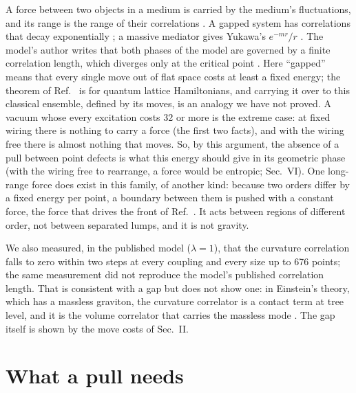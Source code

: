 \documentclass[pre,twocolumn,superscriptaddress,nofootinbib]{revtex4-2}
\begin{document}
A force between two objects in a medium is carried by the medium's fluctuations, and its range is the range of their
correlations \cite{KG99}. A gapped system has correlations that decay exponentially \cite{HK06}; a massive mediator gives
Yukawa's $e^{-mr}/r$ \cite{Tong}. The model's author writes that both phases of the model are governed by a finite
correlation length, which diverges only at the critical point \cite{T25}. Here ``gapped'' means that every single move
out of flat space costs at least a fixed energy; the theorem of Ref.~\cite{HK06} is for quantum lattice Hamiltonians,
and carrying it over to this classical ensemble, defined by its moves, is an analogy we have not proved. A vacuum whose
every excitation costs 32 or more is the extreme case: at fixed wiring there is nothing to carry a force (the first two
facts), and with the wiring free there is almost nothing that moves. So, by this argument, the absence of a pull
between point defects is what this energy should give in its geometric phase (with the wiring free to rearrange, a
force would be entropic; Sec.~VI). One long-range force does exist in this family, of another kind: because two orders differ by a fixed energy per point, a boundary between them
is pushed with a constant force, the force that drives the front of Ref.~\cite{paper1}. It acts between regions of
different order, not between separated lumps, and it is not gravity.

We also measured, in the published model ($\lambda = 1$), that the curvature correlation falls to zero within two
steps at every coupling and every size up to 676 points; the same measurement did not reproduce the model's
published correlation length. That is consistent with a gap but does not show one: in Einstein's theory, which has a
massless graviton, the curvature correlator is a contact term at tree level, and it is the volume correlator that
carries the massless mode \cite{LR25}. The gap itself is shown by the move costs of Sec.~II.

\section{What a pull needs}
\end{document}
